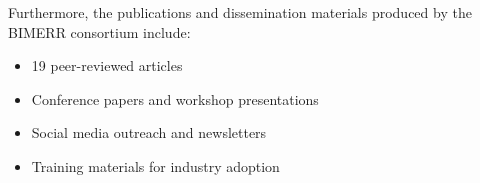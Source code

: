 Furthermore, the publications and dissemination materials produced by the BIMERR consortium include:
\begin{itemize}
    \item 19 peer-reviewed articles
    \item Conference papers and workshop presentations
    \item Social media outreach and newsletters
    \item Training materials for industry adoption
\end{itemize}